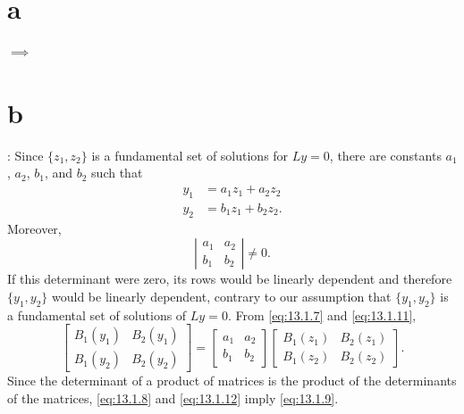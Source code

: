 \part{a} $\implies$ \part{b}: Since $\{z_{1},z_{2}\}$ is a fundamental set of solutions for $Ly=0$,
there are constants $a_{1}$, $a_{2}$, $b_{1}$, and $b_{2}$ such that
\begin{equation}
  \label{eq:13.1.11}
  \begin{aligned}
    y_{1} & =a_{1}z_{1}+a_{2}z_{2}  \\
    y_{2} & =b_{1}z_{1}+b_{2}z_{2}.
  \end{aligned}
\end{equation}
Moreover,
\begin{equation}
  \label{eq:13.1.12}\left|
  \begin{array}{ccccccc}
    a_{1} & a_{2} \\
    b_{1} & b_{2}
  \end{array}\right|\ne0.
\end{equation}
If this determinant were zero, its rows would be linearly dependent and therefore
$\{y_{1},y_{2}\}$ would be linearly dependent, contrary to our assumption that $\{y_{1},y_{2}\}$ is
a fundamental set of solutions of $Ly=0$. From \eqref{eq:13.1.7} and \eqref{eq:13.1.11},
\[
  \left[
  \begin{array}{ccccccc}
    B_{1}(y_{1}) & B_{2}(y_{1}) \\
    B_{1}(y_{2}) & B_{2}(y_{2})
  \end{array}\right]= \left[
  \begin{array}{ccccccc}
    a_{1} & a_{2} \\
    b_{1} & b_{2}
  \end{array}\right] \left[
  \begin{array}{ccccccc}
    B_{1}(z_{1}) & B_{2}(z_{1}) \\
    B_{1}(z_{2}) & B_{2}(z_{2})
  \end{array}\right].
\]
Since the determinant of a product of matrices is the product of the determinants of the matrices,
\eqref{eq:13.1.8} and \eqref{eq:13.1.12} imply \eqref{eq:13.1.9}.

